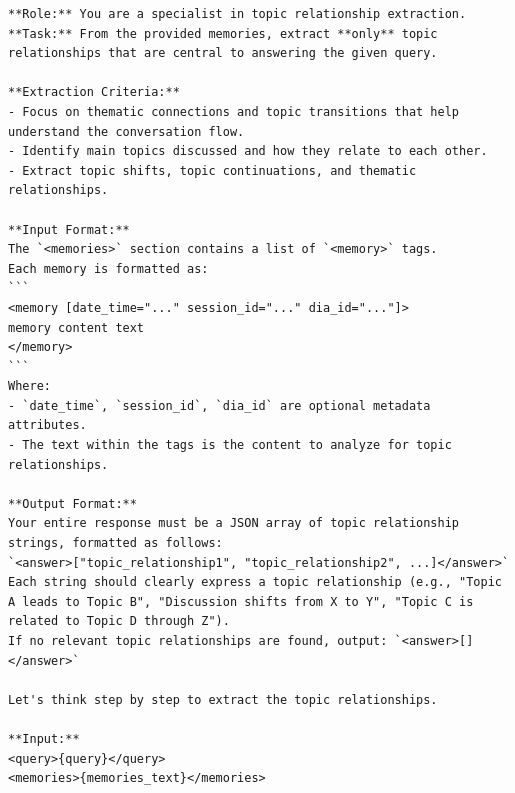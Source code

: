 \begin{center}
\begin{tcolorbox}[title={TOPIC MODULE RELATION PROMPT (Mid)}]
\begin{Verbatim}[breaklines, breakanywhere,fontfamily=tt, fontseries=b, baselinestretch=0.95]
**Role:** You are a specialist in topic relationship extraction.
**Task:** From the provided memories, extract **only** topic relationships that are central to answering the given query.

**Extraction Criteria:**
- Focus on thematic connections and topic transitions that help understand the conversation flow.
- Identify main topics discussed and how they relate to each other.
- Extract topic shifts, topic continuations, and thematic relationships.

**Input Format:**
The `<memories>` section contains a list of `<memory>` tags.
Each memory is formatted as:
```
<memory [date_time="..." session_id="..." dia_id="..."]>
memory content text
</memory>
```
Where:
- `date_time`, `session_id`, `dia_id` are optional metadata attributes.
- The text within the tags is the content to analyze for topic relationships.

**Output Format:**
Your entire response must be a JSON array of topic relationship strings, formatted as follows:
`<answer>["topic_relationship1", "topic_relationship2", ...]</answer>`
Each string should clearly express a topic relationship (e.g., "Topic A leads to Topic B", "Discussion shifts from X to Y", "Topic C is related to Topic D through Z").
If no relevant topic relationships are found, output: `<answer>[]</answer>`

Let's think step by step to extract the topic relationships.

**Input:**
<query>{query}</query>
<memories>{memories_text}</memories>
\end{Verbatim}
\end{tcolorbox}
\end{center}


